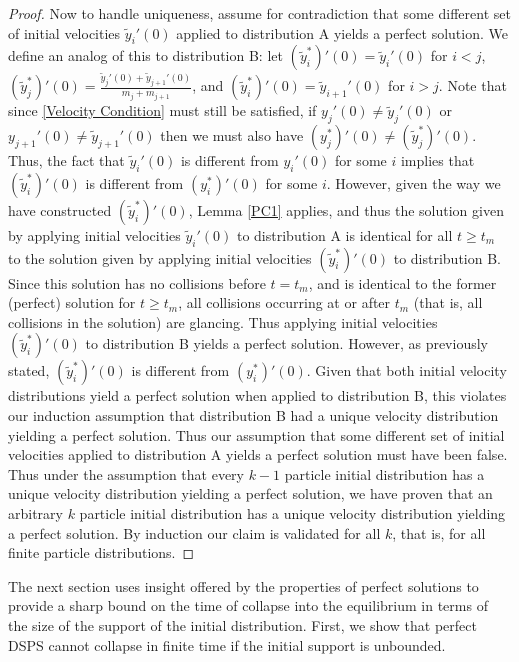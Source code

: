 \documentclass[11pt]{article}
\numberwithin{equation}{section}
\begin{document}
\begin{proof}
            Now to handle uniqueness, assume for contradiction that some different set of initial velocities $\tilde{y}_i'(0)$ applied to distribution A yields a perfect solution. We define an analog of this to distribution B: let $(\tilde{y}_i^*)'(0) = \tilde{y}_i'(0)$ for $i<j$, $(\tilde{y}_j^*)'(0) = \frac{\tilde{y}_j'(0) + \tilde{y}_{j+1}'(0)}{m_j+m_{j+1}}$, and $(\tilde{y}_i^*)'(0) = \tilde{y}_{i+1}'(0)$ for $i>j$. Note that since \eqref{Velocity Condition} must still be satisfied, if $y_j'(0) \neq \tilde{y}_j'(0)$ or $y_{j+1}'(0) \neq \tilde{y}_{j+1}'(0)$ then we must also have $(y_j^*)'(0) \neq (\tilde{y}_j^*)'(0)$. Thus, the fact that $\tilde{y}_i'(0)$ is different from $y_i'(0)$ for some $i$ implies that $(\tilde{y}_i^*)'(0)$ is different from $(y_i^*)'(0)$ for some $i$. However, given the way we have constructed $(\tilde{y}_i^*)'(0)$, Lemma \ref{PC1} applies, and thus the solution given by applying initial velocities $\tilde{y}_i'(0)$ to distribution A is identical for all $t \ge t_m$ to the solution given by applying initial velocities $(\tilde{y}_i^*)'(0)$ to distribution B. Since this solution has no collisions before $t=t_m$, and is identical to the former (perfect) solution for $t \ge t_m$, all collisions occurring at or after $t_m$ (that is, all collisions in the solution) are glancing. Thus applying initial velocities $(\tilde{y}_i^*)'(0)$ to distribution B yields a perfect solution. However, as previously stated, $(\tilde{y}_i^*)'(0)$ is different from $(y_i^*)'(0)$. Given that both initial velocity distributions yield a perfect solution when applied to distribution B, this violates our induction assumption that distribution B had a unique velocity distribution yielding a perfect solution. Thus our assumption that some different set of initial velocities applied to distribution A yields a perfect solution must have been false. Thus under the assumption that every $k-1$ particle initial distribution has a unique velocity distribution yielding a perfect solution, we have proven that an arbitrary $k$ particle initial distribution has a unique velocity distribution yielding a perfect solution. By induction our claim is validated for all $k$, that is, for all finite particle distributions.
        \end{proof}
        The next section uses insight offered by the properties of perfect solutions to provide a sharp bound on the time of collapse into the equilibrium in terms of the size of the support of the initial distribution. First, we show that perfect DSPS cannot collapse in finite time if the initial support is unbounded.
    
\end{document}
